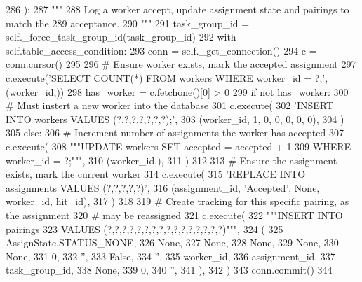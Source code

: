 \begin{DoxyCode}
286     ):
287         \textcolor{stringliteral}{"""}
288 \textcolor{stringliteral}{        Log a worker accept, update assignment state and pairings to match the}
289 \textcolor{stringliteral}{        acceptance.}
290 \textcolor{stringliteral}{        """}
291         task\_group\_id = self.\_force\_task\_group\_id(task\_group\_id)
292         with self.table\_access\_condition:
293             conn = self.\_get\_connection()
294             c = conn.cursor()
295 
296             \textcolor{comment}{# Ensure worker exists, mark the accepted assignment}
297             c.execute(\textcolor{stringliteral}{'SELECT COUNT(*) FROM workers WHERE worker\_id = ?;'}, (worker\_id,))
298             has\_worker = c.fetchone()[0] > 0
299             \textcolor{keywordflow}{if} \textcolor{keywordflow}{not} has\_worker:
300                 \textcolor{comment}{# Must instert a new worker into the database}
301                 c.execute(
302                     \textcolor{stringliteral}{'INSERT INTO workers VALUES (?,?,?,?,?,?,?);'},
303                     (worker\_id, 1, 0, 0, 0, 0, 0),
304                 )
305             \textcolor{keywordflow}{else}:
306                 \textcolor{comment}{# Increment number of assignments the worker has accepted}
307                 c.execute(
308                     \textcolor{stringliteral}{"""UPDATE workers SET accepted = accepted + 1}
309 \textcolor{stringliteral}{                             WHERE worker\_id = ?;"""},
310                     (worker\_id,),
311                 )
312 
313             \textcolor{comment}{# Ensure the assignment exists, mark the current worker}
314             c.execute(
315                 \textcolor{stringliteral}{'REPLACE INTO assignments VALUES (?,?,?,?,?)'},
316                 (assignment\_id, \textcolor{stringliteral}{'Accepted'}, \textcolor{keywordtype}{None}, worker\_id, hit\_id),
317             )
318 
319             \textcolor{comment}{# Create tracking for this specific pairing, as the assignment}
320             \textcolor{comment}{# may be reassigned}
321             c.execute(
322                 \textcolor{stringliteral}{"""INSERT INTO pairings}
323 \textcolor{stringliteral}{                         VALUES (?,?,?,?,?,?,?,?,?,?,?,?,?,?,?,?)"""},
324                 (
325                     AssignState.STATUS\_NONE,
326                     \textcolor{keywordtype}{None},
327                     \textcolor{keywordtype}{None},
328                     \textcolor{keywordtype}{None},
329                     \textcolor{keywordtype}{None},
330                     \textcolor{keywordtype}{None},
331                     0,
332                     \textcolor{stringliteral}{''},
333                     \textcolor{keyword}{False},
334                     \textcolor{stringliteral}{''},
335                     worker\_id,
336                     assignment\_id,
337                     task\_group\_id,
338                     \textcolor{keywordtype}{None},
339                     0,
340                     \textcolor{stringliteral}{''},
341                 ),
342             )
343             conn.commit()
344 
\end{DoxyCode}
